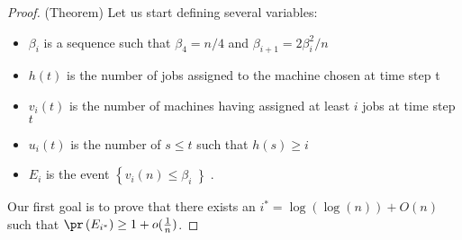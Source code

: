 \begin{proof}(Theorem)
  Let us start defining several variables:
  \begin{itemize}
  \item $\beta_i$ is a sequence such that $\beta_4 = n / 4$ and
    $\beta_{i+1} = 2\beta_i^2 / n$
  \item $h(t)$ is the number of jobs assigned to the machine chosen
    at time step t
  \item $v_i(t)$ is the number of machines having assigned at least $i$
    jobs at time step $t$
  \item $u_i(t)$ is the number of $s \leq t$ such that $h(s) \geq i$
  \item $E_i$ is the event $\left\{v_i(n) \leq \beta_i\left\}$.
  \end{itemize}
  Our first goal is to prove that there exists an $i^*=\log\left(\log(n)\right) + O(n)$ such that $\pr\left(E_{i^*}\right) \geq 1 + o(\frac{1}{n})$.     
  

\end{proof}
